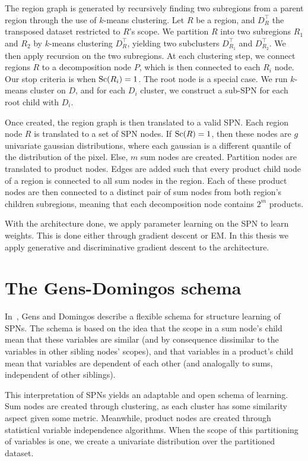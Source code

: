 The region graph is generated by recursively finding two subregions from a parent region through
the use of $k$-means clustering. Let $R$ be a region, and $D_R^\intercal$ the transposed dataset
restricted to $R$'s scope. We partition $R$ into two subregions $R_1$ and $R_2$ by $k$-means
clustering $D_R^\intercal$, yielding two subclusters $D_{R_1}^\intercal$ and $D_{R_2}^\intercal$.
We then apply recursion on the two subregions. At each clustering step, we connect regions $R$ to a
decomposition node $P$, which is then connected to each $R_i$ node. Our stop criteria is when
$\operatorname*{\text{Sc}}(R_i)=1$. The root node is a special case. We run $k$-means cluster on $D$, and for each
$D_i$ cluster, we construct a sub-SPN for each root child with $D_i$.

Once created, the region graph is then translated to a valid SPN\@. Each region node $R$ is
translated to a set of SPN nodes. If $\operatorname*{\text{Sc}}(R)=1$, then these nodes are $g$ univariate gaussian
distributions, where each gaussian is a different quantile of the distribution of the pixel. Else,
$m$ sum nodes are created. Partition nodes are translated to product nodes. Edges are added such
that every product child node of a region is connected to all sum nodes in the region. Each of
these product nodes are then connected to a distinct pair of sum nodes from both region's children
subregions, meaning that each decomposition node contains $2^m$ products.

With the architecture done, we apply parameter learning on the SPN to learn weights. This is done
either through gradient descent or EM\@. In this thesis we apply generative and discriminative
gradient descent to the architecture.

\section{The Gens-Domingos schema}

In~\cite{gens-domingos}, Gens and Domingos describe a flexible schema for structure learning of
SPNs. The schema is based on the idea that the scope in a sum node's child mean that these
variables are similar (and by consequence dissimilar to the variables in other sibling nodes'
scopes), and that variables in a product's child mean that variables are dependent of each other
(and analogally to sums, independent of other siblings).

This interpretation of SPNs yields an adaptable and open schema of learning. Sum nodes are created
through clustering, as each cluster has some similarity aspect given some metric. Meanwhile,
product nodes are created through statistical variable independence algorithms. When the scope of
this partitioning of variables is one, we create a univariate distribution over the partitioned
dataset.

